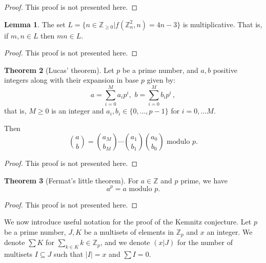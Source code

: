 \documentclass[12pt]{amsart}
\theoremstyle{definition}
\newtheorem{thm}{Theorem}[section]
\newtheorem{lm}[thm]{Lemma}
\newcommand{\Z}{\mathbb{Z}}
\begin{document}
\begin{proof}
This proof is not presented here.
\end{proof}

\begin{lm}
The set $L = \{n \in \Z_{\geq 0} | f(\Z_n^2, n ) = 4n - 3 \} $ is multiplicative.
That is, if $m, n\in L$ then $mn\in L$.
\end{lm}

\begin{proof}
This proof is not presented here.
\end{proof}

\begin{thm}[Lucas' theorem]
Let $p$ be a prime number, and $a, b $ positive integers along with their expansion in base $p$ given by:
$$a = \sum_{i=0}^M a_ip^i, \, \, b = \sum_{i=0}^M b_ip^i \, ,$$
that is, $M\geq 0 $ is an integer and $a_i, b_i \in \{ 0 , \ldots , p-1 \}$ for $i=0, \ldots M$.

Then 
$$\binom{a}{b} = \binom{a_M}{b_M} \cdots \binom{a_1}{b_1} \binom{a_0}{b_0} \text{ modulo $p$.}$$
\end{thm}

\begin{proof}
This proof is not presented here.
\end{proof}

\begin{thm}[Fermat's little theorem]
For $a \in \Z$ and $p$ prime, we have
$$a^p = a \text{ modulo $p$.}$$
\end{thm}

\begin{proof}
This proof is not presented here.
\end{proof}

We now introduce useful notation for the proof of the Kemnitz conjecture.
Let $p$ be a prime number, $J, K$ be a multisets of elements in $\Z_p$ and $x$ an integer.
We denote $\sum K $ for $\sum_{k\in K} k \in \Z_p$, and we denote $(x|J)$ for the number of multisets $I\subseteq J$ such that $|I| = x$ and $\sum I = 0$.
\end{document}

